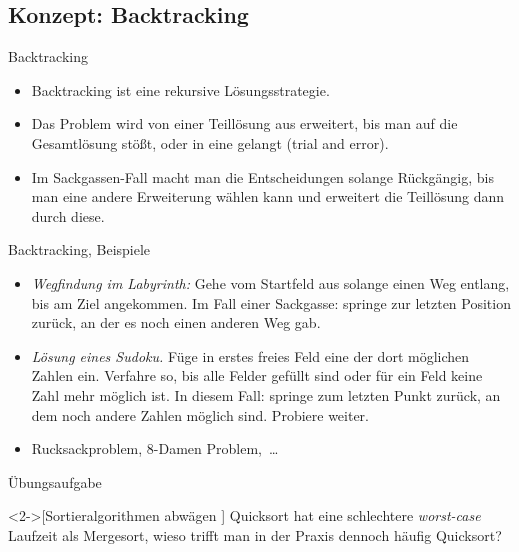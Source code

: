 \subsection{Konzept: Backtracking}

\begin{frame}{Backtracking}
    \begin{itemize}[<+(1)->]
        \widei
        \item Backtracking ist eine rekursive Lösungsstrategie.
        \item Das Problem wird von einer Teillösung aus erweitert, bis man auf die Gesamtlösung stößt,\pause{} oder in eine  gelangt (trial and error).
        \item Im Sackgassen-Fall macht man die Entscheidungen solange Rückgängig, bis man eine andere Erweiterung wählen kann und erweitert die Teillösung dann durch diese.
    \end{itemize}
\end{frame}


\begin{frame}{Backtracking, Beispiele}
    \begin{itemize}[<+(1)->]
        \widei
        \item \emph{Wegfindung im Labyrinth:}\pause{} Gehe vom Startfeld aus solange einen Weg entlang, bis am Ziel angekommen.\pause{} Im Fall einer Sackgasse: springe zur letzten Position zurück, an der es noch einen anderen Weg gab.
        \item \emph{Lösung eines Sudoku.}\pause{} Füge in erstes freies Feld eine der dort möglichen Zahlen ein.\pause{} Verfahre so, bis alle Felder gefüllt sind oder für ein Feld keine Zahl mehr möglich ist.\pause{} In diesem Fall: springe zum letzten Punkt zurück, an dem noch andere Zahlen möglich sind. Probiere weiter.
        \item Rucksackproblem, 8-Damen Problem,~\ldots
    \end{itemize}
\end{frame}

\ifull
\begin{frame}[c]{Übungsaufgabe}
    \begin{exercise}<2->[Sortieralgorithmen abwägen ]
        Quicksort hat eine schlechtere \emph{worst-case} Laufzeit als Mergesort, wieso trifft man in der Praxis dennoch häufig Quicksort?
    \end{exercise}
\end{frame}

